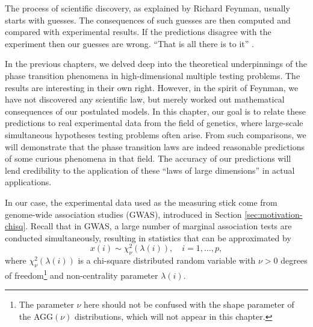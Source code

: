 
The process of scientific discovery, as explained by Richard Feynman, usually starts with guesses.
The consequences of such guesses are then computed and compared with experimental results.
If the predictions disagree with the experiment then our guesses are wrong. ``That is all there is to it''  \citep{feynman2017character}.

In the previous chapters, we delved deep into the theoretical underpinnings of the phase transition phenomena in high-dimensional multiple testing problems.
The results are interesting in their own right.
However, in the spirit of Feynman, we have not discovered any scientific law, but merely worked out mathematical consequences of our postulated models.
In this chapter, our goal is to relate these predictions to real experimental data from the field of genetics, where large-scale simultaneous hypotheses testing problems often arise.
From such comparisons, we will demonstrate that the phase transition laws are indeed reasonable predictions of some curious phenomena in that field.
The accuracy of our predictions will lend credibility to the application of these ``laws of large dimensions'' in actual applications.

\medskip

In our case, the experimental data used as the measuring stick come from genome-wide association studies (\ac{GWAS}), introduced in Section \ref{sec:motivation-chisq}.
Recall that in \ac{GWAS}, a large number of marginal association tests are conducted simultaneously, resulting in statistics that can be approximated by
\begin{equation} \label{eq:model-chisq-Chapter6}
    x(i) \sim \chi_\nu^2\left(\lambda(i)\right), \quad i=1,\ldots,p,
\end{equation}
where $\chi_\nu^2\left(\lambda(i)\right)$ is a chi-square distributed random variable with $\nu>0$ degrees of 
freedom\footnote{The parameter $\nu$ here should not be confused with the shape parameter of the AGG$(\nu)$ 
distributions, which will not appear in this chapter.} and non-centrality parameter $\lambda(i)$.


